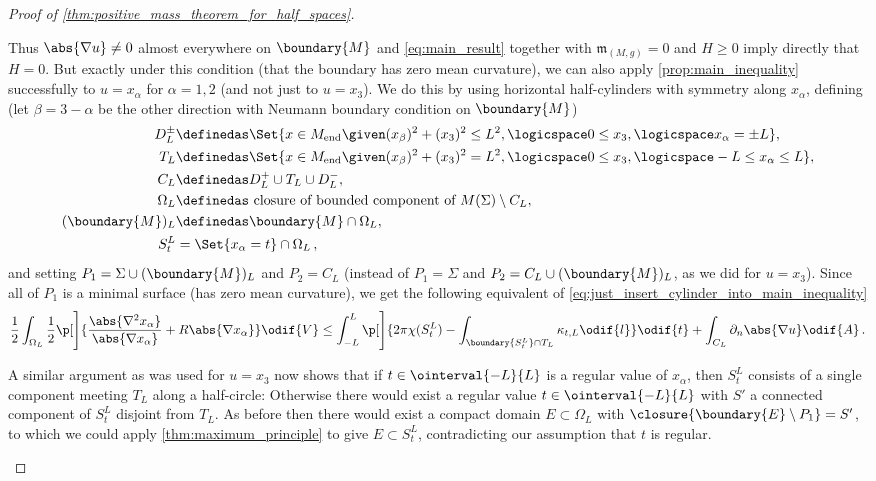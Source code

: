 \documentclass[titlepage,numbers=noenddot,oneside,%
cleardoublepage=empty,paper=a4,fontsize=11pt,%
english,%
]{scrartcl}
\newcommand*{\mathcomma}{\,,}
\newcommand*{\mathfullstop}{\,.}
\newcommand{\Mend}{M_{\mathrm{end}}} %
\newcommand{\mass}[2]{\mathfrak{m}_{(#1,#2)}} %
\begin{document}
\begin{proof}[Proof of \cref{thm:positive_mass_theorem_for_half_spaces}]
\begin{proofdescription}
        Thus \( \abs{\nabla u}\neq 0 \) almost everywhere on \( \boundary{M} \) and \cref{eq:main_result} together with \( \mass{M}{g}=0 \) and \( H\geq 0 \) imply directly that \( H=0 \). But exactly under this condition (that the boundary has zero mean curvature), we can also apply \cref{prop:main_inequality} successfully to \( u=x_{\alpha} \) for \( \alpha=1,2 \) (and not just to \( u=x_3 \)). We do this by using horizontal half-cylinders with symmetry along \( x_\alpha \), defining (let \( \beta=3-\alpha \) be the other direction with Neumann boundary condition on \( \boundary{M} \))
        \begin{align*}
            D_L^{\pm}&\definedas\Set{x\in \Mend\given (x_\beta)^2+(x_3)^2\leq L^2,\logicspace 0\leq x_3,\logicspace x_\alpha=\pm L},\\
            T_L&\definedas\Set{x\in \Mend\given (x_\beta)^2+(x_3)^2=L^2,\logicspace  0\leq x_3,\logicspace -L\leq x_\alpha\leq L},\\
            C_L&\definedas D_L^+\cup T_L \cup D_L^-,\\
            \Omega_L&\definedas \text{ closure of bounded component of } M(\Sigma)\setminus C_L,\\
            (\boundary{M})_L&\definedas \boundary{M}\cap \Omega_L,\\
            S_t^L&=\Set{x_\alpha=t}\cap \Omega_L\mathcomma
        \end{align*} 
        and setting \( P_1=\Sigma\cup (\boundary{M})_L \) and \( P_2=C_L \) (instead of \( P_1=\Sigma \) and \( P_2=C_L\cup (\boundary{M})_L \), as we did for \( u=x_3 \)). Since all of \( P_1 \) is a minimal surface (has zero mean curvature), we get the following equivalent of \cref{eq:just_insert_cylinder_into_main_inequality}
        \begin{equation*}
            \frac{1}{2}\int_{\Omega_L}\frac{1}{2}\p[\Bigg]{\frac{\abs{\nabla^2 x_\alpha}}{\abs{\nabla x_\alpha}}+R\abs{\nabla x_{\alpha}}}\odif{V}\leq \int_{-L}^L\p[\Bigg]{2\pi \chi(S_t^L)-\int_{\boundary{S_t^L}\cap  T_L}\kappa_{t,L}\odif{l}}\odif{t}+\int_{C_L} \partial_n \abs{\nabla u}\odif{A}\mathfullstop
        \end{equation*}

        A similar argument as was used for \( u=x_3 \) now shows that if \( t\in \ointerval{-L}{L} \) is a regular value of \( x_\alpha \), then \( S_t^L \) consists of a single component meeting \( T_L \) along a half-circle: Otherwise there would exist a regular value \( t \in \ointerval{-L}{L}\) with \( S' \) a connected component of \( S_t^L \) disjoint from \( T_L \). As before then there would exist a compact domain \( E\subset \Omega_L \) with \( \closure{\boundary{E}\setminus P_1}=S' \), to which we could apply \cref{thm:maximum_principle} to give \( E\subset S_t^L \), contradicting our assumption that \( t \) is regular.


\end{proofdescription}
\end{proof}
\end{document}

